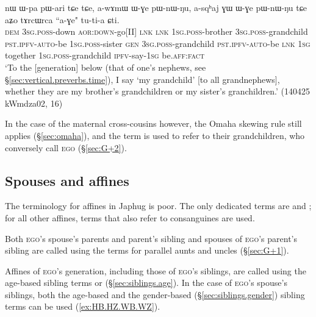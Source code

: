\begin{exe}
\ex \label{ex:ZChCh.BChCh}
\gll nɯ ɯ-pa pɯ-ari tɕe tɕe, a-wɤmɯ ɯ-ɣe pɯ-nɯ-ŋu, a-sqʰaj ɣɯ ɯ-ɣe pɯ-nɯ-ŋu tɕe aʑo tɤrcɯrca ``a-ɣe" tu-ti-a ɕti. \\
\textsc{dem} \textsc{3sg}.\textsc{poss}-down \textsc{aor}:\textsc{down}-go[II] \textsc{lnk} \textsc{lnk} \textsc{1sg}.\textsc{poss}-brother \textsc{3sg}.\textsc{poss}-grandchild \textsc{pst}.\textsc{ipfv}-\textsc{auto}-be \textsc{1sg}.\textsc{poss}-sister \textsc{gen} \textsc{3sg}.\textsc{poss}-grandchild \textsc{pst}.\textsc{ipfv}-\textsc{auto}-be \textsc{lnk} \textsc{1sg} together \textsc{1sg}.\textsc{poss}-grandchild \textsc{ipfv}-say-\textsc{1sg} be.\textsc{aff}:\textsc{fact} \\
\glt `To the [generation] below (that of one's nephews, see §\ref{sec:vertical.preverbs.time}), I say  `my grandchild' [to all grandnephews], whether they are my brother's grandchildren or my sister's granchildren.' (140425 kWmdza02, 16)
\end{exe}

In the case of the maternal cross-cousins however, the Omaha skewing rule still applies (§\ref{sec:omaha}), and the term  is used to refer to their grandchildren, who conversely call \textsc{ego}  (§\ref{sec:G+2}).


\subsection{Spouses and affines} \label{sec:spouses}
The terminology for affines in Japhug is poor. The only dedicated terms are  and ; for all other affines, terms that also refer to consanguines are used.

Both \textsc{ego}'s spouse's parents and parent's sibling and spouses of \textsc{ego}'s parent's sibling are called using the terms for parallel aunts and uncles (§\ref{sec:G+1}).

Affines of \textsc{ego}'s generation, including those of \textsc{ego}'s siblings, are called using the age-based sibling terms  or  (§\ref{sec:siblings.age}). In the case of \textsc{ego}'s spouse's siblings, both the age-based and the gender-based (§\ref{sec:siblings.gender}) sibling terms can be used (\ref{ex:HB.HZ.WB.WZ}).

